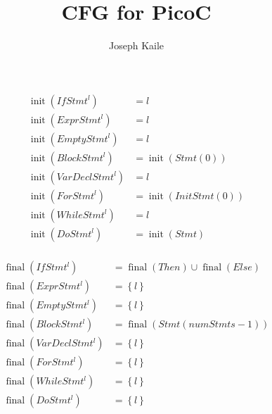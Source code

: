 \documentclass{article}
\title{CFG for PicoC}
\author{Joseph Kaile}
\DeclareMathOperator{\init}{init}
\DeclareMathOperator{\final}{final}
\begin{document}
\maketitle

\begin{equation*}
\begin{split}
\init(IfStmt^l) 	&= l \\
\init(ExprStmt^l) 	&= l \\
\init(EmptyStmt^l) 	&= l \\
\init(BlockStmt^l) 	&= \init(Stmt(0)) \\
\init(VarDeclStmt^l) 	&= l \\
\init(ForStmt^l) 	&= \init(InitStmt(0)) \\
\init(WhileStmt^l) 	&= l \\
\init(DoStmt^l) 	&= \init(Stmt) \\
\end{split}
\end{equation*}

\begin{equation*}
\begin{split}
\final(IfStmt^l) 	&= \final(Then) \cup \final(Else) \\
\final(ExprStmt^l) 	&= \left\{ {l} \right\} \\ 
\final(EmptyStmt^l) 	&= \left\{ {l} \right\} \\ 
\final(BlockStmt^l) 	&= \final(Stmt(numStmts-1)) \\
\final(VarDeclStmt^l) 	&= \left\{ {l} \right\} \\ 
\final(ForStmt^l) 	&= \left\{ {l} \right\} \\ 
\final(WhileStmt^l) 	&= \left\{ {l} \right\} \\ 
\final(DoStmt^l) 	&= \left\{ {l} \right\} \\ 
\end{split}
\end{equation*}
\end{document}
